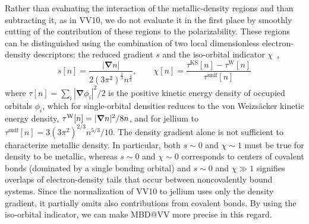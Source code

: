 Rather than evaluating the interaction of the metallic-density regions and than subtracting it, as in VV10, we do not evaluate it in the first place by smoothly cutting of the contribution of these regions to the polarizability.
These regions can be distinguished using the combination of two local dimensionless electron-density descriptors: the reduced gradient $s$ and the iso-orbital indicator $\chi$~\citep{BeckeJCP90,KummelMP03,SunPRL13},
\begin{equation}
  s[n]=\frac{|\boldsymbol\nabla n|}{2{(3\pi^2)}^\frac13n^\frac43},\qquad
  \chi[n]=\frac{\tau^\text{KS}[n]-\tau^\text{W}[n]}{\tau^\text{unif}[n]}
\end{equation}
where $\tau[n]=\sum_i|\boldsymbol\nabla\phi_i|^2/2$ is the positive kinetic energy density of occupied orbitals $\phi_i$, which for single-orbital densities reduces to the von Weizsäcker kinetic energy density, $\tau^\text W[n]=|\boldsymbol\nabla n|^2/8n$, and for jellium to $\tau^\mathrm{unif}[n]=3(3\pi^2)^{2/3}n^{5/3}/10$.  %
The density gradient alone is not sufficient to characterize metallic density.
In particular, both $s\sim0$ and $\chi\sim1$ must be true for density to be metallic, whereas $s\sim0$ and $\chi\sim0$ corresponds to centers of covalent bonds (dominated by a single bonding orbital) and $s\sim0$ and $\chi\gg1$ signifies overlaps of electron-density tails that occur between noncovalently bound systems.
Since the normalization of VV10 to jellium uses only the density gradient, it partially omits also contributions from covalent bonds.
By using the iso-orbital indicator, we can make MBD@VV more precise in this regard.

